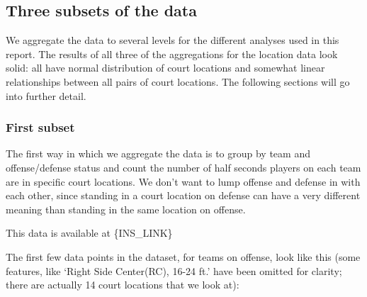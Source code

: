 \documentclass[]{article}
\begin{document}
\hypertarget{three-subsets-of-the-data}{%
\subsection{Three subsets of the data}\label{three-subsets-of-the-data}}

We aggregate the data to several levels for the different analyses used
in this report. The results of all three of the aggregations for the
location data look solid: all have normal distribution of court
locations and somewhat linear relationships between all pairs of court
locations. The following sections will go into further detail.

\hypertarget{first-subset}{%
\subsubsection{First subset}\label{first-subset}}

The first way in which we aggregate the data is to group by team and
offense/defense status and count the number of half seconds players on
each team are in specific court locations. We don't want to lump offense
and defense in with each other, since standing in a court location on
defense can have a very different meaning than standing in the same
location on offense.

This data is available at \{INS\_LINK\}

The first few data points in the dataset, for teams on offense, look
like this (some features, like `Right Side Center(RC), 16-24 ft.' have
been omitted for clarity; there are actually 14 court locations that we
look at):
\end{document}
